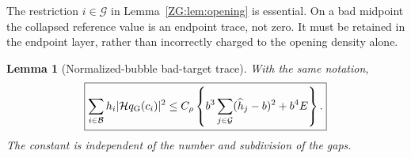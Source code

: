 \documentclass[11pt]{amsart}
\numberwithin{equation}{section}
\newtheorem{lemma}[theorem]{Lemma}
\theoremstyle{definition}
\theoremstyle{remark}
\newcommand{\Hil}{\mathcal H}
\begin{document}
The restriction $i\in\mathcal G$ in Lemma~\ref{ZG:lem:opening} is
essential.  On a bad midpoint the collapsed reference value is an
endpoint trace, not zero.  It must be retained in the endpoint layer,
rather than incorrectly charged to the opening density alone.

\begin{lemma}[Normalized-bubble bad-target trace]\label{ZG:lem:gap-target}
With the same notation,
\begin{equation}\label{ZG:eq:gap-target}
 \boxed{
 \sum_{i\in\mathcal B}h_i|\Hil q_{\rm G}(c_i)|^2
 \le C_\rho\left\{
 b^3\sum_{j\in\mathcal G}(\widehat h_j-b)^2+b^4E\right\}.}
\end{equation}
The constant is independent of the number and subdivision of the gaps.
\end{lemma}
\end{document}
